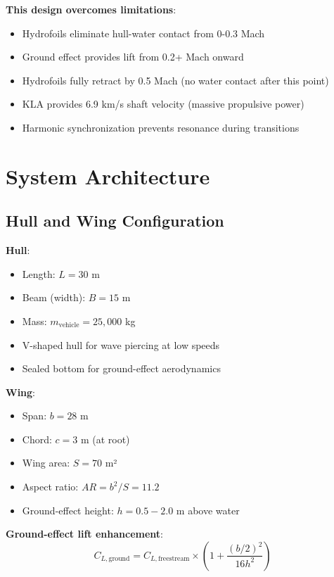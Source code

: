 \documentclass[12pt,a4paper]{article}
\begin{document}
\textbf{This design overcomes limitations}:
\begin{itemize}
\item Hydrofoils eliminate hull-water contact from 0-0.3 Mach
\item Ground effect provides lift from 0.2+ Mach onward
\item Hydrofoils fully retract by 0.5 Mach (no water contact after this point)
\item KLA provides 6.9 km/s shaft velocity (massive propulsive power)
\item Harmonic synchronization prevents resonance during transitions
\end{itemize}

\section{System Architecture}

\subsection{Hull and Wing Configuration}

\textbf{Hull}:
\begin{itemize}
\item Length: $L = 30$ m
\item Beam (width): $B = 15$ m
\item Mass: $m_{\text{vehicle}} = 25,000$ kg
\item V-shaped hull for wave piercing at low speeds
\item Sealed bottom for ground-effect aerodynamics
\end{itemize}

\textbf{Wing}:
\begin{itemize}
\item Span: $b = 28$ m
\item Chord: $c = 3$ m (at root)
\item Wing area: $S = 70$ m²
\item Aspect ratio: $AR = b^2/S = 11.2$
\item Ground-effect height: $h = 0.5-2.0$ m above water
\end{itemize}

\textbf{Ground-effect lift enhancement}:
\begin{equation}
C_{L,\text{ground}} = C_{L,\text{freestream}} \times \left(1 + \frac{(b/2)^2}{16 h^2}\right)
\end{equation}
\end{document}
